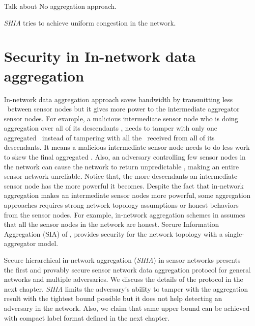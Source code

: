 	Talk about No aggregation approach.

	\textit{SHIA} tries to achieve uniform congestion in the network.	

\section{Security in In-network data aggregation}
	In-network data aggregation approach saves bandwidth by transmitting less \payloads\  between sensor nodes but it gives more power to the intermediate aggregator sensor nodes. 
	For example, a malicious intermediate sensor node who is doing aggregation over all of its descendants \payloads, needs to tamper with only one aggregated \payload\ instead of tampering with all the \payloads\ received from all of its descendants. 
	It means a malicious intermediate sensor node needs to do less work to skew the final aggregated \payload.
	Also, an adversary controlling few sensor nodes in the network can cause the network to return unpredictable \payloads, making an entire sensor network unreliable.
	Notice that, the more descendants an intermediate sensor node has the more powerful it becomes.
	Despite the fact that in-network aggregation makes an intermediate sensor nodes more powerful, some aggregation approaches requires strong network topology assumptions or honest behaviors from the sensor nodes.
	For example, in-network aggregation schemes in \cite{yao2002cougar, madden2003design} assumes that all the sensor nodes in the network are honest. Secure Information Aggregation (SIA) of \cite{przydatek2003sia}, provides security for the network topology with a single-aggregator model.  

	Secure hierarchical in-network aggregation (\textit{SHIA}) in sensor networks \cite{chan2006secure} presents the first and provably secure sensor network data aggregation protocol for general networks and multiple adversaries. 
	We discuss the details of the protocol in the next chapter. 
	\textit{SHIA} limits the adversary's ability to tamper with the aggregation result with the tightest bound possible but it does not help detecting an adversary in the network.
	Also, we claim that same upper bound can be achieved with compact label format defined in the next chapter.